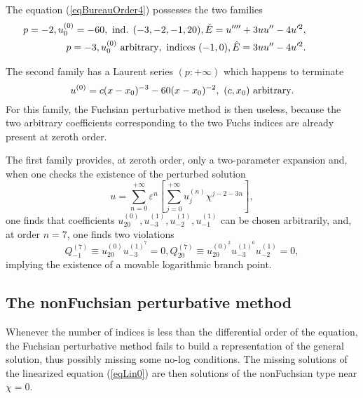 \documentclass[10pt]{article}
\begin{document}
The equation (\ref{eqBureauOrder4}) possesses the two families
\begin{eqnarray}
& &
{\hskip -16.0 truemm}
p=-2, u_0^{(0)}=-60, \hbox{ ind. } (-3,-2,-1,20),
  {\hat E}=u'''' + 3 u u'' - 4 u'^2, 
\\
& &
{\hskip -16.0 truemm}
p=-3, u_0^{(0)} \hbox{ arbitrary}, \hbox{ indices } (-1,0),
  {\hat E}= 3 u u'' - 4 u'^2. 
\label{eqBureau4p3}
\end{eqnarray}
 
The second family has a Laurent series $(p:+ \infty)$ which happens to
terminate \cite{CFP1993}
\begin{equation}
 u^{(0)}=c (x-x_0)^{-3}-60(x-x_0)^{-2},\ (c,x_0) \hbox{ arbitrary}.
\label{eqBureau4PartSol}
\end{equation}
For this family, the Fuchsian perturbative method is then useless,
because the two arbitrary coefficients corresponding to the two Fuchs indices
are already present at zeroth order.
 
The first family provides, at zeroth order, only a two-parameter
expansion and,
when one checks the existence of the perturbed solution
\begin{equation}
 u=\sum_{n=0}^{+ \infty} \varepsilon^n
 \left[\sum_{j=0}^{+ \infty} u_j^{(n)} \chi^{j-2-3n}\right],
\end{equation}
one finds that coefficients
$u_{20}^{(0)}, u_{-3}^{(1)}, u_{-2}^{(1)}, u_{-1}^{(1)}$
can be chosen arbitrarily,
and, at order $n=7$, one finds two violations \cite{CFP1993}
\begin{equation}
   Q_{-1}^{(7)} \equiv u_{20}^{(0)}   u_{-3}^{(1)^7} = 0,
   Q_{20}^{(7)} \equiv u_{20}^{(0)^2} u_{-3}^{(1)^6} u_{-2}^{(1)} = 0,
\end{equation}
implying the existence of a movable logarithmic branch point.
 
\subsection{The nonFuchsian perturbative method}
\label{sectionMethodPerturbativeNonFuchsian}

Whenever the number of indices is less than the differential order of
the equation,
the Fuchsian perturbative method fails to build a
representation of the general solution,
thus possibly missing some no-log conditions.
The missing solutions of the linearized equation (\ref{eqLin0})
are then solutions of the nonFuchsian type near $\chi=0$.
\end{document}
